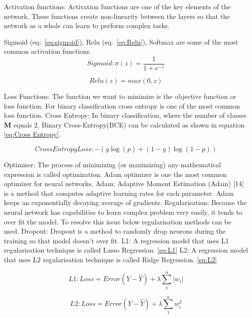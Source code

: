 \begin{outline}
 \1 Activation functions: Activation functions are one of the key elements of the network. These functions create non-linearity between the layers so that the network as a whole can learn to perform complex tasks. 
 
 Sigmoid (eq:~\ref{eq:sigmoid}), Relu (eq:~\ref{eq:Relu}), Softmax are some of the most common activation functions. 
 \begin{equation} \label{eq:sigmoid}
    Sigmoid: \sigma(z) = \frac{1} {1 + e^{-z}}
\end{equation}

\begin{equation} \label{eq:Relu}
    Relu(z) = max(0, z)
\end{equation}

 \1 Loss Functions: The function we want to minimize is the objective function or loss function. For binary classification cross entropy is one of the most common loss function.
    \2 Cross Entropy: In binary classification, where the number of classes \textbf{M} equals 2, Binary Cross-Entropy(BCE) can be calculated as shown in equation \ref{eq:Cross Entropy}. 
    
    \begin{equation} \label{eq:Cross Entropy}
       Cross Entropy Loss: -{(y\log(p) + (1 - y)\log(1 - p))}
    \end{equation}
    
 \1 Optimiser:  The process of minimizing (or maximizing) any mathematical expression is called optimization. Adam optimizer is one the most common optimizer for neural networks. 
    \2 Adam: Adaptive Moment Estimation (Adam) [14] is a method that computes adaptive learning rates for each parameter.  Adam  keeps an exponentially decaying average of gradients. 
 \1 Regularisation: Because the neural network has capabilities to learn complex problem very easily, it tends to over fit the model. To resolve this issue below regularisation methods can be used. 
    \2 Dropout: Dropout is a method to randomly drop neurons during the training so that model doesn't over fit. 
    \2 L1: A regression model that uses L1 regularisation technique is called Lasso Regression. \ref{eq:L1}
    \2 L2: A regression model that uses L2 regularisation technique is called Ridge Regression. \ref{eq:L2}
    
    \begin{equation} \label{eq:L1}
        L1: Loss = Error(Y - \widehat{Y}) + \lambda \sum_1^n |w_i|
    \end{equation}
    
    \begin{equation} \label{eq:L2}
        L2: Loss = Error(Y - \widehat{Y}) +  \lambda \sum_1^n w_i^{2}
    \end{equation}

\end{outline}



